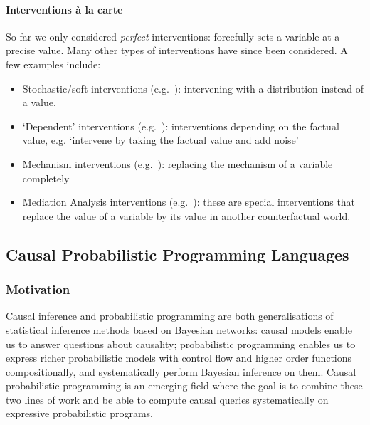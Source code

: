 \documentclass[11pt,a4paper]{article}
\begin{document}
\paragraph{Interventions à la carte}\label{par:intv} 
So far we only considered \emph{perfect} interventions: forcefully sets a variable at a precise value. Many other types of interventions have since been considered. A few examples include:
\begin{itemize}
    \item Stochastic/soft interventions (e.g.~\cite{didelez2006_stoch_mech_intv, munoz2012_stochastic_intv,
dawid2002_stoch_intv, jacobs2019causal}): intervening with a distribution instead of a value.
    \item `Dependent' interventions (e.g.~\cite{haneuse2013_dependent_intv,
Young2014-mx_dependent_intv}): interventions depending on the factual value, e.g. `intervene by taking the factual value and add noise'
    \item Mechanism interventions (e.g.~\cite{didelez2006_stoch_mech_intv,pearl2009causality}): replacing the mechanism of a variable completely
    \item Mediation Analysis interventions (e.g.~\cite{pearl2014interpretation,tutorialchirho,wang2026causalppl}): these are special interventions that replace the value of a variable by its value in another counterfactual world. 
\end{itemize}



\subsection{Causal Probabilistic Programming Languages}\label{sec:cppl}

\subsubsection{Motivation} Causal inference and probabilistic programming are both generalisations of statistical inference methods based on Bayesian networks: causal models enable us to answer questions about causality; probabilistic programming enables us to express richer probabilistic models with control flow and higher order functions compositionally, and systematically perform Bayesian inference on them. Causal probabilistic programming is an emerging field where the goal is to combine these two lines of work and be able to compute causal queries systematically on expressive probabilistic programs. 
\end{document}

